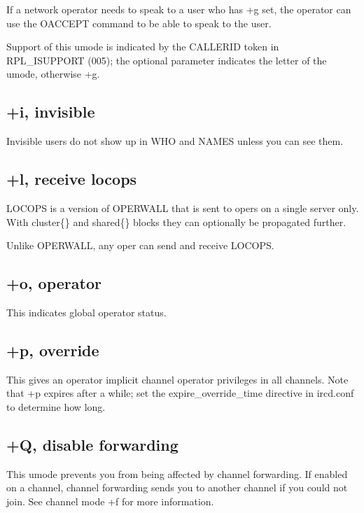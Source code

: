 	If a network operator needs to speak to a user who has +g set, the
	operator can use the OACCEPT command to be able to speak to the user.
 

	Support of this umode is indicated by the CALLERID token in
	RPL\_ISUPPORT (005); the optional parameter indicates the letter of the
	umode, otherwise +g.


\subsection{+i, invisible}

	Invisible users do not show up in WHO and NAMES unless you can see them.
 

\subsection{+l, receive locops}

	LOCOPS is a version of OPERWALL that is sent to opers on a single
	server only. With cluster\{\} and shared\{\} blocks they can optionally
	be propagated further.
 

	Unlike OPERWALL, any oper can send and receive LOCOPS.


\subsection{+o, operator}

	This indicates global operator status.


\subsection{+p, override}

	This gives an operator implicit channel operator privileges in all
	channels. Note that +p expires after a while; set the
	expire\_override\_time directive in ircd.conf to determine how long.


\subsection{+Q, disable forwarding}

	This umode prevents you from being affected by channel forwarding. If
	enabled on a channel, channel forwarding sends you to another channel
	if you could not join. See channel mode +f for more information.


